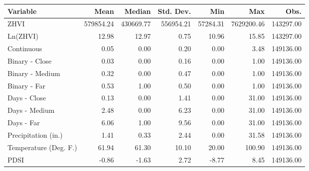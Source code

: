 \begin{table}[ht]
\centering
\begin{tabular}{lrrrrrr}
  \toprule
Variable & Mean & Median & Std. Dev. & Min & Max & Obs. \\ 
  \midrule
ZHVI & 579854.24 & 430669.77 & 556954.21 & 57284.31 & 7629200.46 & 143297.00 \\ 
  Ln(ZHVI) & 12.98 & 12.97 & 0.75 & 10.96 & 15.85 & 143297.00 \\ 
  Continuous & 0.05 & 0.00 & 0.20 & 0.00 & 3.48 & 149136.00 \\ 
  Binary - Close & 0.03 & 0.00 & 0.16 & 0.00 & 1.00 & 149136.00 \\ 
  Binary - Medium & 0.32 & 0.00 & 0.47 & 0.00 & 1.00 & 149136.00 \\ 
  Binary - Far & 0.53 & 1.00 & 0.50 & 0.00 & 1.00 & 149136.00 \\ 
  Days - Close & 0.13 & 0.00 & 1.41 & 0.00 & 31.00 & 149136.00 \\ 
  Days - Medium & 2.48 & 0.00 & 6.23 & 0.00 & 31.00 & 149136.00 \\ 
  Days - Far & 6.06 & 1.00 & 9.56 & 0.00 & 31.00 & 149136.00 \\ 
  Precipitation (in.) & 1.41 & 0.33 & 2.44 & 0.00 & 31.58 & 149136.00 \\ 
  Temperature (Deg. F.) & 61.94 & 61.30 & 10.10 & 20.00 & 100.90 & 149136.00 \\ 
  PDSI & -0.86 & -1.63 & 2.72 & -8.77 & 8.45 & 149136.00 \\ 
   \bottomrule
\end{tabular}
\end{table}
